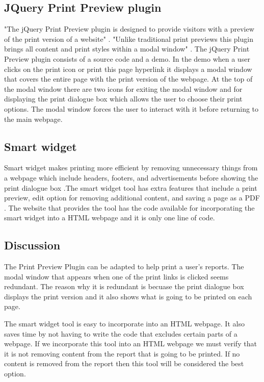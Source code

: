 \documentclass[letterpaper,10pt,serif, draftclsnofoot,onecolumn, compsoc, titlepage]{IEEEtran}
\begin{document}
\subsection{JQuery Print Preview plugin}
"The jQuery Print Preview plugin is designed to provide visitors with a preview of the print version of a website" \cite{Sam}. "Unlike traditional print previews this plugin brings all content and print styles within a modal window" \cite{Sam}. The jQuery Print Preview plugin consists of a source code and a demo. In the demo when a user clicks on the print icon or print this page hyperlink it displays a modal window that covers the entire page with the print version of the webpage. At the top of the modal window there are two icons for exiting the modal window and for displaying the print dialogue box which allows the user to choose their print options. The modal window forces the user to interact with it before returning to the main webpage.

\subsection{Smart widget}
Smart widget makes printing more efficient by removing unnecessary things from a webpage which include headers, footers, and advertisements before showing the print dialogue box \cite{SmartW}.The smart widget tool has extra features that include a print preview, edit option for removing additional content, and saving a page as a PDF \cite{SmartW}. The website that provides the tool has the code available for incorporating the smart widget into a HTML webpage and it is only one line of code. 

\subsection{Discussion}
The Print Preview Plugin can be adapted to help print a user's reports. The modal window that appears when one of the print links is clicked seems redundant. The reason why it is redundant is becuase the print dialogue box displays the print version and it also shows what is going to be printed on each page. 

The smart widget tool is easy to incorporate into an HTML webpage. It also saves time by not having to write the code that excludes certain parts of a webpage. If we incorporate this tool into an HTML webpage we must verify that it is not removing content from the report that is going to be printed. If no content is removed from the report then this tool will be considered the best option. 
\end{document}
